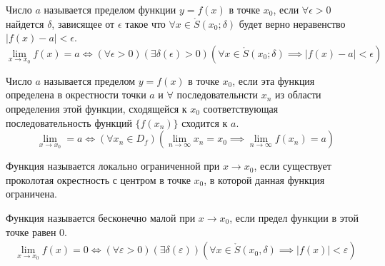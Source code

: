 \begin{definition} \label{def:28}
    Число $a$ называется пределом функции $y = f\left( x \right) $ в точке $x_0$, если $\forall \epsilon > 0$ найдется $\delta$, зависящее от  $\epsilon$ такое что $\forall x \in \mathring{S}(x_0; \delta)$ будет верно неравенство $|f\left( x \right) - a| < \epsilon$.
    \[
        \lim_{x \to x_0} f(x) = a \iff (\forall \epsilon > 0)(\exists  \delta(\epsilon) > 0)(\forall  x \in \mathring{S}(x_0; \delta) \implies |f(x) - a| < \epsilon)
    \]
\end{definition}

\begin{definition} \label{def:29}
    Число $a$ называется пределом $y = f\left( x \right) $ в точке $x_0$, если эта функция определена в окрестности точки $a$ и $\forall$ последовательнсти $x_{n}$ из области определения этой функции, сходящейся к $x_0$ соответствующая последовательность функций $\{f(x_{n})\}$ сходится к $a$. \[
        \lim_{x \to x_0} = a \iff (\forall x_{n}\in D_f)(\lim_{n \to \infty} x_{n} = x_0 \implies \lim_{n \to \infty} f(x_{n}) = a) 
    \] 
\end{definition}

\begin{definition} \label{def:34}
    Функция называется локально ограниченной при $x \to x_0$, если существует проколотая окрестность с центром в точке $x_0$, в которой данная функция ограничена.
\end{definition}

\begin{definition} \label{def:35}
    Функция называется бесконечно малой при $x \to x_0$, если предел функции в этой точке равен $0$.
    \begin{gather*}
        \lim_{x \to x_0} f(x) = 0 \iff (\forall \varepsilon > 0)(\exists \delta(\varepsilon)) (\forall x \in \mathring{S}(x_0, \delta) \implies |f(x)| < \varepsilon )
    \end{gather*}
\end{definition}
